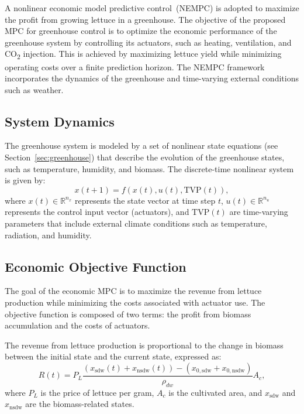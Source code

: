 \documentclass[conference]{IEEEtran}
\begin{document}
A nonlinear economic model predictive control~(NEMPC) is adopted to maximize the profit from growing lettuce in a greenhouse. The objective of the proposed MPC for greenhouse control is to optimize the economic performance of the greenhouse system by controlling its actuators, such as heating, ventilation, and CO\textsubscript{2} injection. This is achieved by maximizing lettuce yield while minimizing operating costs over a finite prediction horizon. The NEMPC framework incorporates the dynamics of the greenhouse and time-varying external conditions such as weather.

\subsection{System Dynamics}\label{subsec:mpc_dynamics}

The greenhouse system is modeled by a set of nonlinear state equations (see Section~\ref{sec:greenhouse}) that describe the evolution of the greenhouse states, such as temperature, humidity, and biomass. The discrete-time nonlinear system is given by:
\begin{equation}
    x(t+1) = f\left( x(t), u(t), \text{TVP}(t) \right),
\end{equation}
where \(x(t) \in \mathbb{R}^{n_x}\) represents the state vector at time step \(t\), \(u(t) \in \mathbb{R}^{n_u}\) represents the control input vector (actuators), and \(\text{TVP}(t)\) are time-varying parameters that include external climate conditions such as temperature, radiation, and humidity.

\subsection{Economic Objective Function}\label{subsec:mpc_objective}

The goal of the economic MPC is to maximize the revenue from lettuce production while minimizing the costs associated with actuator use. The objective function is composed of two terms: the profit from biomass accumulation and the costs of actuators.

The revenue from lettuce production is proportional to the change in biomass between the initial state and the current state, expressed as:
\begin{equation}
    R(t) = P_L  \frac{(x_{\mathrm{sdw}}(t) + x_{\mathrm{nsdw}}(t)) - (x_{0, \mathrm{sdw}} + x_{0, \mathrm{nsdw} })}{\rho_{dw}}  A_c,
\end{equation}
where \(P_L\) is the price of lettuce per gram, \(A_c\) is the cultivated area, and \(x_{\mathrm{sdw}}\) and \(x_{\mathrm{nsdw}}\) are the biomass-related states.
\end{document}
